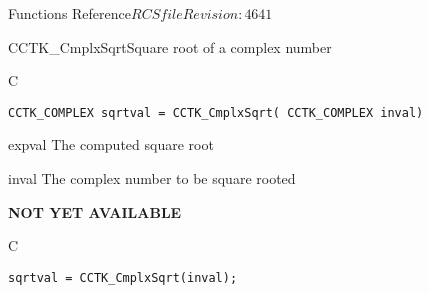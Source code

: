 \begin{cactuspart}{ Functions Reference}{$RCSfile$}{$Revision: 4641 $}
\begin{FunctionDescription}{CCTK\_CmplxSqrt}{Square root of a complex number}
\label{CCTK-CmplxSqrt}
\begin{SynopsisSection}
\begin{Synopsis}{C}
\begin{verbatim}CCTK_COMPLEX sqrtval = CCTK_CmplxSqrt( CCTK_COMPLEX inval)\end{verbatim}
\end{Synopsis}
\end{SynopsisSection}
\begin{ParameterSection}
\begin{Parameter}{expval}
The computed square root
\end{Parameter}
\begin{Parameter}{inval}
The complex number to be square rooted
\end{Parameter}
\end{ParameterSection}
\begin{Discussion}
{\bf NOT YET AVAILABLE}
\end{Discussion}
\begin{ExampleSection}
\begin{Example}{C}
\begin{verbatim}
sqrtval = CCTK_CmplxSqrt(inval);
\end{verbatim}
\end{Example}
\end{ExampleSection}
\end{FunctionDescription}


\end{cactuspart}
